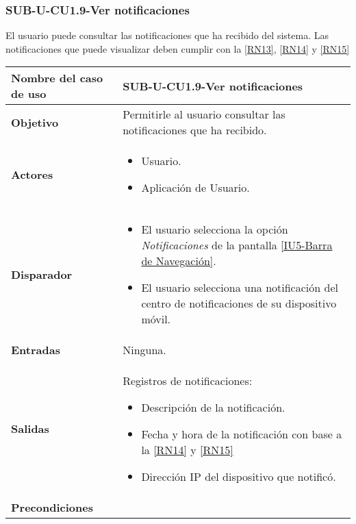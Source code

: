
\subsubsection{SUB-U-CU1.9-Ver notificaciones}\label{SUB-U-CU1.9}
El usuario puede consultar las notificaciones que ha recibido del sistema. Las notificaciones que puede visualizar deben cumplir con la \ref{RN13}, \ref{RN14} y \ref{RN15}

\begin{longtable}{|J{5cm}|J{10.3cm}|}
	\hline
	\textbf{Nombre del caso de uso} &
		SUB-U-CU1.9-Ver notificaciones \\ \hline
	\textbf{Objetivo} &
		Permitirle al usuario consultar las notificaciones que ha recibido. \\ \hline
	\textbf{Actores} &
	    \begin{itemize}
		    \item Usuario. 
		    \item Aplicación de Usuario.
		\end{itemize}
		    \\ \hline 
	\textbf{Disparador} & 
		\begin{itemize}
		    \item El usuario selecciona la opción \textit{Notificaciones} de la pantalla \hyperref[fig:Barra de navegacion]{[IU5-Barra de Navegación]}.
		    \item El usuario selecciona una notificación del centro de notificaciones de su dispositivo móvil.
		 \end{itemize}
		 \\ \hline 
	\textbf{Entradas} & Ninguna.
		\\ \hline 
	\textbf{Salidas} & 
	    Registros de notificaciones:
		\begin{itemize}
			\item Descripción de la notificación.
			\item Fecha y hora de la notificación con base a la \ref{RN14} y \ref{RN15}
			\item Dirección IP del dispositivo que notificó.
		\end{itemize} 
		\\ \hline
	\textbf{Precondiciones} &
	    \begin{itemize}

\end{itemize}
\end{longtable}

